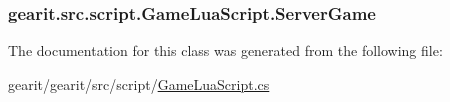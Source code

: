\hypertarget{classgearit_1_1src_1_1script_1_1_game_lua_script_a4ff05d299d3e333f3a4ece87acec786d}{
\subsubsection[{Server\+Game}]{ gearit.\+src.\+script.\+Game\+Lua\+Script.\+Server\+Game\hspace{0.3cm}{\ttfamily [get]}}}\label{classgearit_1_1src_1_1script_1_1_game_lua_script_a4ff05d299d3e333f3a4ece87acec786d}


The documentation for this class was generated from the following file\+:\begin{DoxyCompactItemize}
\item 
gearit/gearit/src/script/\hyperlink{_game_lua_script_8cs}{Game\+Lua\+Script.\+cs}\end{DoxyCompactItemize}
